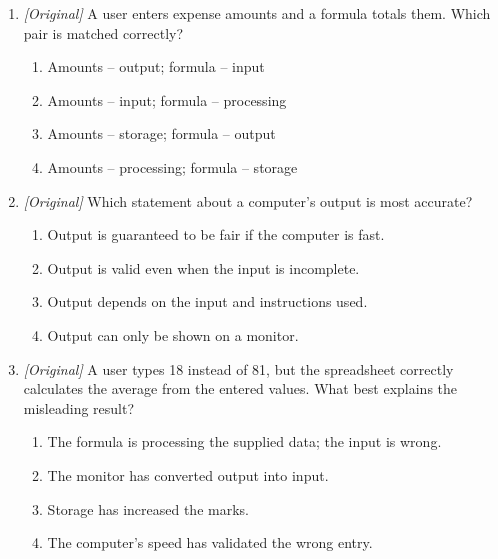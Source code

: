\documentclass[11pt]{article}
\begin{document}
\begin{enumerate}[label=\textbf{Q\arabic*.}, leftmargin=*]
\begin{enumerate}[label=\Alph*.]
  \end{enumerate}
\item \textit{[Original]} A user enters expense amounts and a formula totals
  them. Which pair is matched correctly?
  \begin{enumerate}[label=\Alph*.]
    \item Amounts -- output; formula -- input
    \item Amounts -- input; formula -- processing
    \item Amounts -- storage; formula -- output
    \item Amounts -- processing; formula -- storage
  \end{enumerate}
\item \textit{[Original]} Which statement about a computer's output is
  most accurate?
  \begin{enumerate}[label=\Alph*.]
    \item Output is guaranteed to be fair if the computer is fast.
    \item Output is valid even when the input is incomplete.
    \item Output depends on the input and instructions used.
    \item Output can only be shown on a monitor.
  \end{enumerate}
\item \textit{[Original]} A user types 18 instead of 81, but the spreadsheet
  correctly calculates the average from the entered values. What best
  explains the misleading result?
  \begin{enumerate}[label=\Alph*.]
    \item The formula is processing the supplied data; the input is wrong.
    \item The monitor has converted output into input.
    \item Storage has increased the marks.
    \item The computer's speed has validated the wrong entry.
  \end{enumerate}


\end{enumerate}
\end{document}
